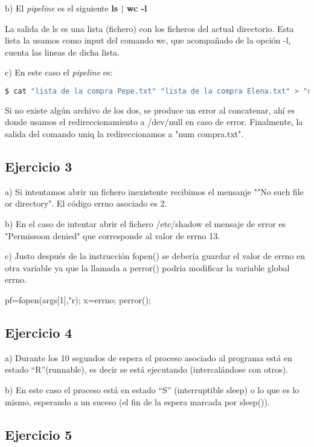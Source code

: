 \documentclass{article}
\begin{document}
b) El \textit{pipeline} es el siguiente \textbf{ls $|$ wc -l}

La salida de ls es una lista (fichero) con los ficheros del actual directorio.
Esta lista la usamos como input del comando wc, que acompañado de la opción -l, cuenta las lineas de dicha lista.


c) En este caso el \textit{pipeline} es: 

\begin{lstlisting}[language=bash]
$ cat "lista de la compra Pepe.txt" "lista de la compra Elena.txt" > "num compra.txt" 2> /dev/null
\end{lstlisting}


Si no existe algún archivo de los dos, se produce un error al concatenar, ahí es donde usamos el redireccionamiento a /dev/null en caso de error.
Finalmente, la salida del comando uniq la redireccionamos a "num compra.txt".

\subsection*{Ejercicio 3}

a) Si intentamos abrir un fichero inexistente recibimos el mensanje ""No such file or directory". El código errno asociado es 2.

b) En el caso de intentar abrir el fichero /etc/shadow el  mensaje de error es "Permissoon denied" que corresponde al valor de errno 13.

c) Justo después de la instrucción fopen() se debería guardar el valor de errno en otra variable ya que la llamada a perror() podría modificar la variable global errno.

pf=fopen(args[1],"r); 
x=errno; 
perror();

\subsection*{Ejercicio 4}

a) Durante los 10 segundos de espera el proceso asociado al programa está en estado ``R''(runnable), es decir se está ejecutando (intercalándose con otros).

b) En este caso el proceso está en estado ``S'' (interruptible sleep) o lo que es lo mismo, esperando a un suceso (el fin de la espera marcada por sleep()). 


\subsection*{Ejercicio 5}
\end{document}
